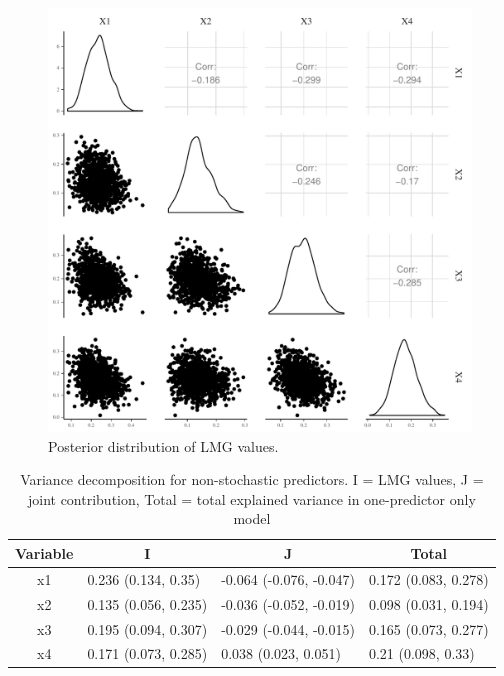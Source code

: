 \documentclass[11pt,a4paper,twoside]{book}\usepackage[]{graphicx}\usepackage[]{color}
\newenvironment{knitrout}{}{} %
\begin{document}
\begin{knitrout}
\color{fgcolor}\begin{figure}

{\centering \includegraphics[width=\textwidth-3cm]{figure/ch03_figsimdata_LMG_plot-1} 

}

\caption[Posterior distribution of LMG values]{Posterior distribution of LMG values.}\label{fig:simdata.LMG.plot}
\end{figure}


\end{knitrout}

\begin{table}[h]
\caption{Variance decomposition for non-stochastic predictors. I = LMG values, J = joint contribution, Total = total explained variance in one-predictor only model}
\centering
\begin{tabular}{clll}
  \toprule
  \multicolumn{1}{c}{\textbf{Variable}} & \multicolumn{1}{c}{\textbf{I}} &\multicolumn{1}{c}{\textbf{J}} & \multicolumn{1}{c}{\textbf{Total}} \\
  \hline
x1 & 0.236 (0.134, 0.35)  & -0.064 (-0.076, -0.047)   & 0.172 (0.083, 0.278)  \\ 
x2 & 0.135 (0.056, 0.235)  & -0.036 (-0.052, -0.019)   & 0.098 (0.031, 0.194)  \\ 
x3 & 0.195 (0.094, 0.307)  & -0.029 (-0.044, -0.015)   & 0.165 (0.073, 0.277)  \\ 
x4 & 0.171 (0.073, 0.285)  & 0.038 (0.023, 0.051)   & 0.21 (0.098, 0.33)  \\ 
   \bottomrule
\end{tabular}
\label{tbl:nonstochEx1}
\end{table}
\end{document}

